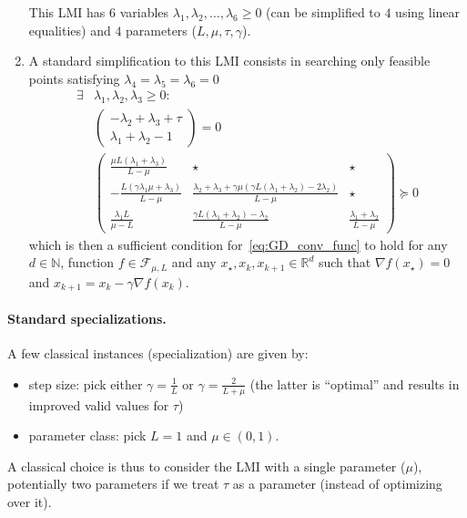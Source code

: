 \documentclass[nonacm]{acmart}
\renewcommand{\geq}{\geqslant}
\renewcommand{\succeq}{\succcurlyeq}
\begin{document}
\begin{enumerate}
This LMI has $6$ variables $\lambda_1,\lambda_2,\ldots,\lambda_6\geq 0$ (can be simplified to $4$ using linear equalities) and $4$ parameters ($L,\mu,\tau,\gamma$).
	\item A standard simplification to this LMI consists in searching only feasible points satisfying $\lambda_4=\lambda_5=\lambda_6=0$
	\begin{equation*}
\begin{aligned}
\exists &\lambda_1,\lambda_2,\lambda_3\geq 0:\\
&\begin{pmatrix}-\lambda_2+\lambda_3+\tau\\\lambda_1+\lambda_2-1
\end{pmatrix}=0\\
&\begin{pmatrix}
 \frac{\mu  L (\lambda_1+\lambda_3)}{L-\mu } & \star & \star \\
 -\frac{L (\gamma  \lambda_1 \mu +\lambda_3)}{L-\mu} & \frac{\lambda_2+\lambda_3+\gamma  \mu  (\gamma  L (\lambda_1+\lambda_2)-2 \lambda_2)}{L-\mu } & \star \\
 \frac{\lambda_1 L}{\mu -L} & \frac{\gamma  L (\lambda_1+\lambda_2)-\lambda_2}{L-\mu } & \frac{\lambda_1+\lambda_2}{L-\mu }
\end{pmatrix}\succeq 0
\end{aligned}
\end{equation*}
which is then a sufficient condition for~\eqref{eq:GD_conv_func} to hold for any $d\in\mathbb{N}$, function $f\in\mathcal{F}_{\mu,L}$ and any $x_\star,x_k,x_{k+1}\in\mathbb{R}^d$ such that $\nabla f(x_\star)=0$ and $x_{k+1}=x_k-\gamma\nabla f(x_k)$.
\end{enumerate}

\paragraph{Standard specializations.} A few classical instances (specialization) are given by:
\begin{itemize}
	\item step size: pick either $\gamma=\frac1L$ or $\gamma=\frac2{L+\mu}$ (the latter is ``optimal'' and results in improved valid values for $\tau$)
	\item parameter class: pick $L=1$ and $\mu\in(0,1)$.
\end{itemize}
A classical choice is thus to consider the LMI with a single parameter ($\mu$), potentially two parameters if we treat $\tau$ as a parameter (instead of optimizing over it). 
\end{document}
